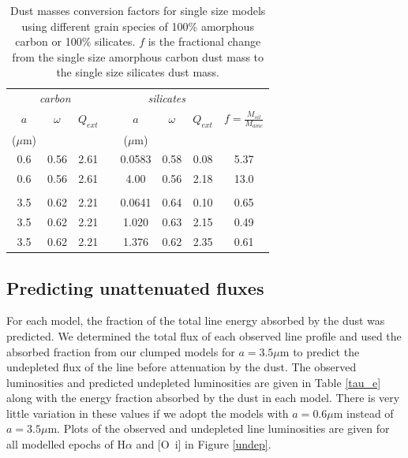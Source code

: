 \documentclass[useAMS,usenatbib,usegraphicx]{mnras}
\begin{document}
\begin{table}
	\caption{Dust masses conversion factors for single size models using different grain species of 100\% amorphous carbon or 100\% silicates. $f$ is the fractional change from the single size amorphous carbon dust mass to the single size silicates dust mass.}
	\label{tb_sil}
	\begin{center}
  	\begin{tabular}{@{} cccccccc @{}}
    	\hline
	\multicolumn{3}{c}{\textit{carbon}} && \multicolumn{3}{c}{\textit{silicates}} & \\
$a$ &$\omega$ &  $Q_{ext}$ & &$a$&$\omega$ & $Q_{ext}$ & $f=\frac{M_{sil}}{M_{amc}}$ \\
($\mu$m) &&&&($\mu$m)\\
\hline
0.6 & 0.56 & 2.61 & &0.0583 & 0.58 &0.08 & 5.37 \\
0.6 &0.56 & 2.61 & &4.00 & 0.56 & 2.18 & 13.0 \\
 \\
3.5 & 0.62 &2.21 & &0.0641 & 0.64 & 0.10 & 0.65 \\
3.5 & 0.62 &2.21 & &1.020 & 0.63 & 2.15 & 0.49 \\
3.5 & 0.62 & 2.21 & &1.376 & 0.62 & 2.35 & 0.61 \\


    \hline
  \end{tabular}
  \end{center}
\end{table}




\subsection{Predicting unattenuated fluxes}

For each model, the fraction of the total line energy absorbed by the dust was predicted.  We determined the total flux of each observed line profile and used the absorbed fraction from our clumped models for $a=3.5\mu$m to predict the undepleted flux of the line before attenuation by the dust.  The observed luminosities and predicted undepleted luminosities are given in Table \ref{tau_e} along with the energy fraction absorbed by the dust in each model.  There is very little variation in these values if we adopt the models with $a=0.6\mu$m instead of $a=3.5\mu$m.  Plots of the observed and undepleted line luminosities are given for all modelled epochs of H$\alpha$ and [O~{\sc i}] in Figure \ref{undep}.
\end{document}
